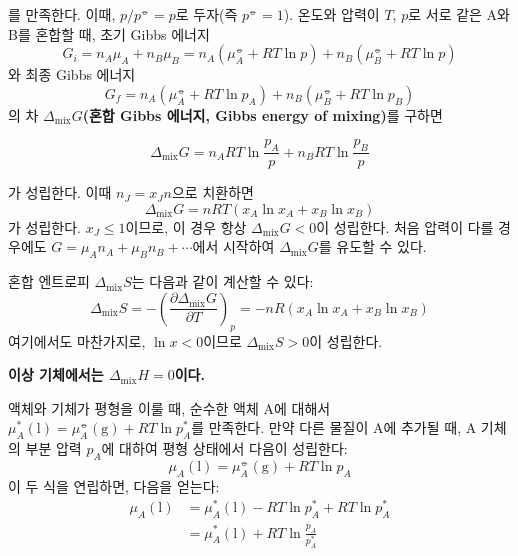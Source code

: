         를 만족한다. 이때, $p/p^\circlehbar = p$로 두자(즉 $p^\circlehbar = 1$). 
        온도와 압력이 $T$, $p$로 서로 같은 A와 B를 혼합할 때, 초기 Gibbs 에너지
        $$
        G_i = n_A \mu_A + n_B \mu_B = n_A\left(\mu_A^\circlehbar +RT\ln{p}\right) + n_B\left(\mu_B^\circlehbar + RT\ln{p}\right)
        $$
        와 최종 Gibbs 에너지
        $$
        G_f = n_A\left(\mu_A^\circlehbar +RT\ln{p_A}\right) + n_B\left(\mu_B^\circlehbar + RT\ln{p_B}\right)
        $$
        의 차 $\Delta_\mathrm{mix}G$\textbf{(혼합 Gibbs 에너지, Gibbs energy of mixing)}를 구하면
        \begin{law}
        \begin{equation*}
            \Delta_\mathrm{mix}G = n_A RT \ln{\frac{p_A}{p}} + n_B RT\ln{\frac{p_B}{p}}
        \end{equation*}
        \end{law}
        가 성립한다. 이때 $n_J = x_J n$으로 치환하면 
        \begin{equation*}
            \Delta_\mathrm{mix}G = nRT \left(x_A \ln{x_A} + x_B \ln{x_B}\right)
        \end{equation*}
        가 성립한다. $x_J \leq 1$이므로, 이 경우 항상 $\Delta_\mathrm{mix}G < 0$이 성립한다. 처음 압력이 다를 경우에도 $G = \mu_A n_A + \mu_B n_B + \cdots$에서 
        시작하여 $\Delta_\mathrm{mix}G$를 유도할 수 있다.
        \par 혼합 엔트로피 $\Delta_\mathrm{mix}S$는 다음과 같이 계산할 수 있다:
        \begin{equation*}
            \Delta_\mathrm{mix}S = -\left(\frac{\partial \Delta_\mathrm{mix}G}{\partial T}\right)_p = -nR\left(x_A \ln{x_A} + x_B \ln{x_B}\right)
        \end{equation*}
        여기에서도 마찬가지로, $\ln{x} < 0$이므로 $\Delta_\mathrm{mix}S>0$이 성립한다.
        \par \textbf{이상 기체에서는 $\Delta_\mathrm{mix}H = 0$이다.}
        \par 액체와 기체가 평형을 이룰 때, 순수한 액체 A에 대해서 $\mu_A^\ast \left(\mathrm{l}\right) = \mu_A^\circlehbar \left(\mathrm{g}\right) + RT \ln{p_A^\ast}$를 
        만족한다. 
        만약 다른 물질이 A에 추가될 때, A 기체의 부분 압력 $p_A$에 대하여 평형 상태에서 다음이 성립한다:
        $$
        \mu_A \left(\mathrm{l}\right) = \mu_A^\circlehbar \left(\mathrm{g}\right) + RT \ln{p_A}
        $$
        이 두 식을 연립하면, 다음을 얻는다:
        \begin{equation*}
            \begin{aligned}
                \mu_A\left(\mathrm{l}\right) &= \mu_A^\ast\left(\mathrm{l}\right) - RT\ln{p_A^\ast}+RT\ln{p_A^\ast}\\
                &= \mu_A^\ast\left(\mathrm{l}\right) + RT\ln{\frac{p_A}{p_A^\ast}}
            \end{aligned}
        \end{equation*}
